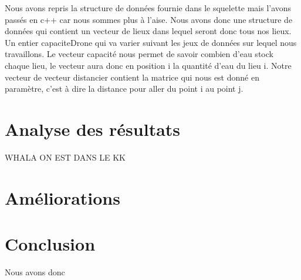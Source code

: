 \documentclass[a4paper,sffamily,12pt]{article}
\begin{document}
			\vspace{0.5cm}

				Nous avons repris la structure de données fournie dans le squelette mais l'avons passés en c++ car nous sommes plus à l'aise. Nous avons donc une structure de données qui contient un vecteur de lieux dans lequel seront donc tous nos lieux. Un entier capaciteDrone qui va varier suivant les jeux de données sur lequel nous travaillons. Le vecteur capacité nous permet de savoir combien d'eau stock chaque lieu, le vecteur aura donc en position i la quantité d'eau du lieu i. Notre vecteur de vecteur distancier contient la matrice qui nous est donné en paramètre, c'est à dire la distance pour aller du point i au point j.
		
		
	\section{Analyse des résultats}
	
		\vspace{0.5cm}		

				WHALA ON EST DANS LE KK
			
			
	\section{Améliorations}
	
		\vspace{0.5cm}		

				
			
			
			
	\section{Conclusion}
	
		\vspace{0.5cm}

				Nous avons donc 
										
\end{document}

